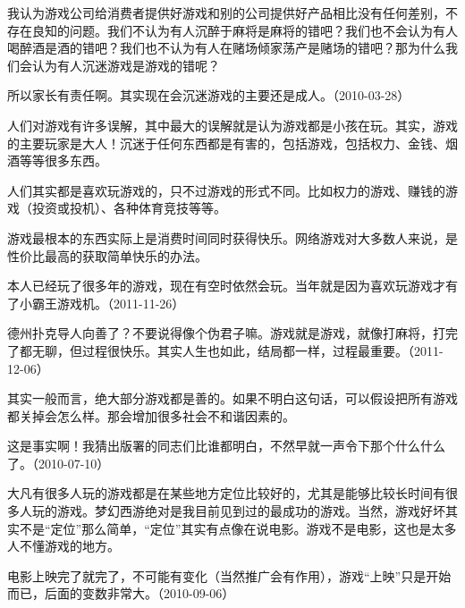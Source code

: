 我认为游戏公司给消费者提供好游戏和别的公司提供好产品相比没有任何差别，不存在良知的问题。我们不认为有人沉醉于麻将是麻将的错吧？我们也不会认为有人喝醉酒是酒的错吧？我们也不认为有人在赌场倾家荡产是赌场的错吧？那为什么我们会认为有人沉迷游戏是游戏的错呢？


所以家长有责任啊。其实现在会沉迷游戏的主要还是成人。（2010-03-28）

人们对游戏有许多误解，其中最大的误解就是认为游戏都是小孩在玩。其实，游戏的主要玩家是大人！沉迷于任何东西都是有害的，包括游戏，包括权力、金钱、烟酒等等很多东西。

人们其实都是喜欢玩游戏的，只不过游戏的形式不同。比如权力的游戏、赚钱的游戏（投资或投机）、各种体育竞技等等。

游戏最根本的东西实际上是消费时间同时获得快乐。网络游戏对大多数人来说，是性价比最高的获取简单快乐的办法。

本人已经玩了很多年的游戏，现在有空时依然会玩。当年就是因为喜欢玩游戏才有了小霸王游戏机。（2011-11-26）


德州扑克导人向善了？不要说得像个伪君子嘛。游戏就是游戏，就像打麻将，打完了都无聊，但过程很快乐。其实人生也如此，结局都一样，过程最重要。（2011-12-06）


其实一般而言，绝大部分游戏都是善的。如果不明白这句话，可以假设把所有游戏都关掉会怎么样。那会增加很多社会不和谐因素的。


这是事实啊！我猜出版署的同志们比谁都明白，不然早就一声令下那个什么什么了。（2010-07-10）


大凡有很多人玩的游戏都是在某些地方定位比较好的，尤其是能够比较长时间有很多人玩的游戏。梦幻西游绝对是我目前见到过的最成功的游戏。当然，游戏好坏其实不是“定位”那么简单，“定位”其实有点像在说电影。游戏不是电影，这也是太多人不懂游戏的地方。


电影上映完了就完了，不可能有变化（当然推广会有作用），游戏“上映”只是开始而已，后面的变数非常大。（2010-09-06）

